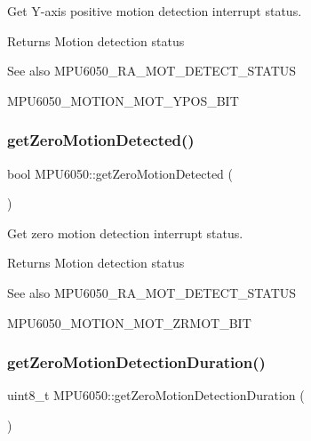 Get Y-\/axis positive motion detection interrupt status. \begin{DoxyReturn}{Returns}
Motion detection status 
\end{DoxyReturn}
\begin{DoxySeeAlso}{See also}
M\+P\+U6050\+\_\+\+R\+A\+\_\+\+M\+O\+T\+\_\+\+D\+E\+T\+E\+C\+T\+\_\+\+S\+T\+A\+T\+US 

M\+P\+U6050\+\_\+\+M\+O\+T\+I\+O\+N\+\_\+\+M\+O\+T\+\_\+\+Y\+P\+O\+S\+\_\+\+B\+IT 
\end{DoxySeeAlso}
\mbox{\label{class_m_p_u6050_a384765351b5c4bd2b6efec9ed71ad1b7}} 
\subsubsection{\texorpdfstring{getZeroMotionDetected()}{getZeroMotionDetected()}}
{\footnotesize\ttfamily bool M\+P\+U6050\+::get\+Zero\+Motion\+Detected (\begin{DoxyParamCaption}{ }\end{DoxyParamCaption})}

Get zero motion detection interrupt status. \begin{DoxyReturn}{Returns}
Motion detection status 
\end{DoxyReturn}
\begin{DoxySeeAlso}{See also}
M\+P\+U6050\+\_\+\+R\+A\+\_\+\+M\+O\+T\+\_\+\+D\+E\+T\+E\+C\+T\+\_\+\+S\+T\+A\+T\+US 

M\+P\+U6050\+\_\+\+M\+O\+T\+I\+O\+N\+\_\+\+M\+O\+T\+\_\+\+Z\+R\+M\+O\+T\+\_\+\+B\+IT 
\end{DoxySeeAlso}
\mbox{\label{class_m_p_u6050_a04c0fcdcd0157b6dbf74d4901424801e}} 
\subsubsection{\texorpdfstring{getZeroMotionDetectionDuration()}{getZeroMotionDetectionDuration()}}
{\footnotesize\ttfamily uint8\+\_\+t M\+P\+U6050\+::get\+Zero\+Motion\+Detection\+Duration (\begin{DoxyParamCaption}{ }\end{DoxyParamCaption})}


